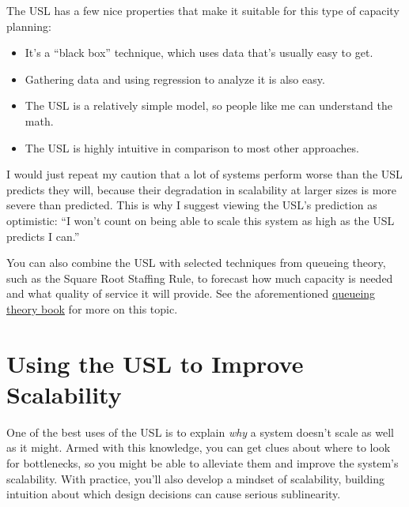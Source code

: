 \documentclass{vivid_layout}
\begin{document}
The USL has a few nice properties that make it suitable for this type of
capacity planning:

\begin{itemize}
\item It's a ``black box'' technique, which uses data that's usually easy to get.
\item Gathering data and using regression to analyze it is also easy.
\item The USL is a relatively simple model, so people like me can understand the math. 
\item The USL is highly intuitive in comparison to most other approaches.
\end{itemize}

I would just repeat my caution that a lot of systems perform worse than the USL
predicts they will, because their degradation in scalability at larger sizes is
more severe than predicted. This is why I suggest viewing the USL's prediction
as optimistic: ``I won't count on being able to scale this system as high as the
USL predicts I can.''

You can also combine the USL with selected techniques from queueing theory, such
as the Square Root Staffing Rule, to forecast how much capacity is needed and
what quality of service it will provide. See the aforementioned
\href{https://www.vividcortex.com/resources/queueing-theory/}{queueing theory
book} for more on this topic.

\section{Using the USL to Improve Scalability}

One of the best uses of the USL is to explain {\itshape why} a system doesn't
scale as well as it might. Armed with this knowledge, you can get clues about
where to look for bottlenecks, so you might be able to alleviate them and
improve the system's scalability.  With practice, you'll also develop a mindset
of scalability, building intuition about which design decisions can cause
serious sublinearity.
\end{document}
